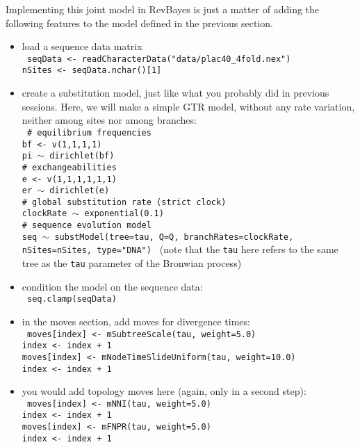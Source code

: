 \documentclass[usletter]{article}
\newcommand{\cmd}[1]{\texttt{#1}}
\begin{document}
Implementing this joint model in RevBayes is just a matter of
adding the following features to the model defined in the previous section.
\begin{itemize}
\item
load a sequence data matrix
\\
\cmd{
seqData <- readCharacterData("data/plac40\_4fold.nex")
\\
nSites <- seqData.nchar()[1]
}
\item
create a substitution model, just like what you probably did in previous sessions. Here, we will make a simple GTR model, without any rate variation, neither among sites nor among branches:
\\
\cmd{
\# equilibrium frequencies
\\
bf <- v(1,1,1,1)
\\
pi $\sim$ dirichlet(bf)
\\
\# exchangeabilities
\\
e <- v(1,1,1,1,1,1)
\\
er $\sim$ dirichlet(e)
\\
\# global substitution rate (strict clock)
\\
clockRate $\sim$ exponential(0.1)
\\
\# sequence evolution model
\\
seq $\sim$ substModel(tree=tau, Q=Q, branchRates=clockRate, nSites=nSites, type="DNA")
}
(note that the \cmd{tau} here refers to the same tree as the \cmd{tau} parameter of the Bronwian process)
\item
condition the model on the sequence data:
\\
\cmd{
seq.clamp(seqData)
}
\item
in the moves section, add moves for divergence times:
\\
\cmd{
moves[index] <- mSubtreeScale(tau, weight=5.0)
\\
index <- index + 1
\\
moves[index] <- mNodeTimeSlideUniform(tau, weight=10.0)
\\
index <- index + 1
}
\item
you would add topology moves here (again, only in a second step):
\\
\cmd{
moves[index] <- mNNI(tau, weight=5.0)
\\
index <- index + 1
\\
moves[index] <- mFNPR(tau, weight=5.0)
\\
index <- index + 1
}
\end{itemize}
\end{document}
